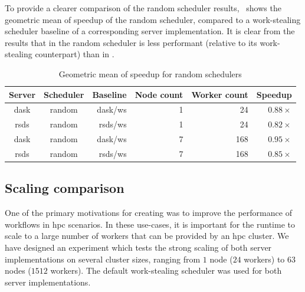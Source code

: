 To provide a clearer comparison of the random scheduler results,~ shows
the geometric mean of speedup of the random scheduler, compared to a work-stealing scheduler
baseline of a corresponding server implementation. It is clear from the results that in
\rsds{} the random scheduler is less performant (relative to its work-stealing
counterpart) than in \dask{}.

\setlength{\tabcolsep}{5pt}
\begin{table}
	\centering
	\begin{tabular}{c|c|r|r|r|r}
		\textbf{Server}      & \textbf{Scheduler} & \textbf{Baseline} & \textbf{Node count} &
		\textbf{Worker	count} & \textbf{Speedup}                                                   \\
		\midrule
		dask                 & random             & dask/ws           & 1                   & 24
		                     & $0.88\times$                                                       \\
		rsds                 & random             & rsds/ws           & 1                   & 24
		                     & $0.82\times$                                                       \\
		dask                 & random             & dask/ws           & 7                   & 168
		                     & $0.95\times$                                                       \\
		rsds                 & random             & rsds/ws           & 7                   & 168
		                     & $0.85\times$                                                       \\
	\end{tabular}
	\caption{Geometric mean of speedup for random schedulers}
	\label{tab:rsds-random-geom-mean-speedup}
\end{table}

\subsection*{Scaling comparison}
One of the primary motivations for creating \rsds{} was to improve the
performance of \dask{} workflows in \gls{hpc} scenarios. In
these use-cases, it is important for the runtime to scale to a large number of workers that can be
provided by an \gls{hpc} cluster. We have designed an experiment which tests the
strong scaling of both server implementations on several cluster sizes, ranging from
$1$ node ($24$ workers) to $63$
nodes ($1512$ workers). The default work-stealing scheduler was used for both
server implementations.

